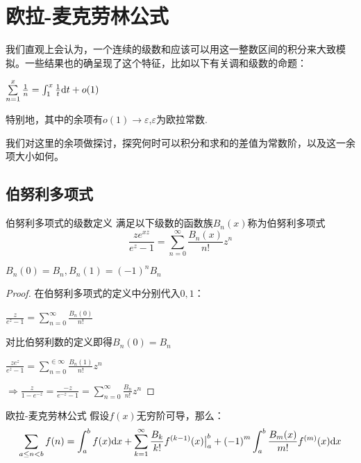 \documentclass[12pt, a4paper, oneside, UTF8]{ctexbook}
\begin{document}
	\section{欧拉-麦克劳林公式}
		我们直观上会认为，一个连续的级数和应该可以用这一整数区间的积分来大致模拟。一些结果也的确呈现了这个特征，比如以下有关调和级数的命题：
		
		$\sum\limits_{n=1}^{x} \frac{1}{n} = \int_{1}^{x} \frac{1}{t}\mathrm{d} t +o(1)$
		
		特别地，其中的余项有$o(1)\to\varepsilon$,$\varepsilon$为欧拉常数.
		
		我们对这里的余项做探讨，探究何时可以积分和求和的差值为常数阶，以及这一余项大小如何。
		\subsection{伯努利多项式}
		\begin{para}{0}
			\begin{defn}{伯努利多项式的级数定义}{}
				满足以下级数的函数族$B_n(x)$称为伯努利多项式
				\begin{equation}
					\frac{z e^{xz}}{e^z-1}=\sum\limits_{n=0}^{\infty} \frac{B_n(x)}{n!}z^n
				\end{equation}
			\end{defn}
			\begin{para}{1}
				\point{}
					\begin{proposition}
						$B_n(0)=B_n,B_n(1)=(-1)^{n}B_n$
					\end{proposition}
					\begin{proof}
						 在伯努利多项式的定义中分别代入$0,1$：
						 
						 $\frac{z}{e^z-1}=\sum\limits_{n=0}^{\infty} \frac{B_n(0)}{n!}$
						 
						 对比伯努利数的定义即得$B_n(0) = B_n$
						 
						 $\frac{z e^z}{e^z-1}=\sum\limits_{n=0}^{\in\infty} \frac{B_n(1)}{n!}z^n$
						 
						 $\Rightarrow\frac{z}{1-e^{-z}}=\frac{-z}{e^{-z}-1} = \sum\limits_{n=0}^{\infty} \frac{B_n}{n!}z^n$
					\end{proof}
			\end{para}
		\end{para}
		\begin{them}{欧拉-麦克劳林公式}{}
			假设$f(x)$无穷阶可导，那么：
			\begin{equation}
				\sum\limits_{a\leq n<b}f(n) = \int_{a}^{b}f(x)\mathrm{d} x+\sum\limits_{k=1}^{\infty}\frac{B_k}{k!}f^{(k-1)}(x)\big|_{a}^{b}+{(-1)}^{m}\int_{a}^{b}\frac{B_m({x})}{m!}f^{(m)}(x)\mathrm{d} x
			\end{equation}
			
		\end{them}
	
\end{document}
